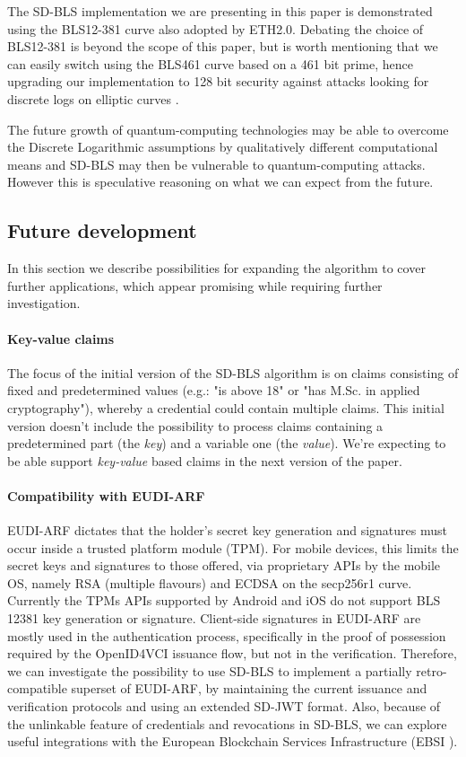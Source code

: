 The SD-BLS implementation we are presenting in this paper is
demonstrated using the BLS12-381 curve \cite{bls381-12} also adopted
by ETH2.0. Debating the choice of BLS12-381 is beyond the scope of
this paper, but is worth mentioning that we can easily switch using the BLS461 curve based on a 461 bit prime, hence upgrading our
implementation to 128 bit security \cite{updating-key-pairings}
against attacks looking for discrete logs on elliptic curves
\cite{discrete-log-attack}.

The future growth
of quantum-computing technologies may be able to overcome the Discrete
Logarithmic assumptions by qualitatively different computational
means and SD-BLS may then be vulnerable to quantum-computing attacks. However this is speculative reasoning on what we can expect from the
future.

\subsection{Future development}
In this section we describe possibilities for expanding the algorithm to cover further applications, which appear promising while requiring further investigation.

\paragraph{Key-value claims}
The focus of the initial version of the SD-BLS algorithm is on claims consisting of fixed and predetermined values (e.g.: "is above 18" or "has M.Sc. in applied cryptography"), whereby a credential could contain multiple claims. This initial version doesn't include the possibility to process claims containing a predetermined part (the \textit{key}) and a variable one (the \textit{value}). We're expecting to be able support \textit{key-value} based claims in the next version of the paper.

\paragraph{Compatibility with EUDI-ARF}
EUDI-ARF dictates that the holder's secret key generation and signatures must occur inside a trusted platform module (TPM). For mobile devices, this limits the secret keys and signatures to those offered, via proprietary APIs by the mobile OS, namely RSA (multiple flavours) and ECDSA on the secp256r1 curve. Currently the TPMs APIs supported by Android and iOS do not support BLS 12381 key generation or signature.
Client-side signatures in EUDI-ARF are mostly used in the authentication process, specifically in the proof of possession required by the OpenID4VCI\cite{OID4VCI} issuance flow, but not in the verification.
Therefore, we can investigate the possibility to use SD-BLS to implement a partially retro-compatible superset of EUDI-ARF, by maintaining the current issuance and verification protocols and using an extended SD-JWT format. Also, because of the unlinkable feature of credentials and revocations in SD-BLS, we can explore useful integrations with the European Blockchain Services Infrastructure (EBSI \cite{ebsi}).


